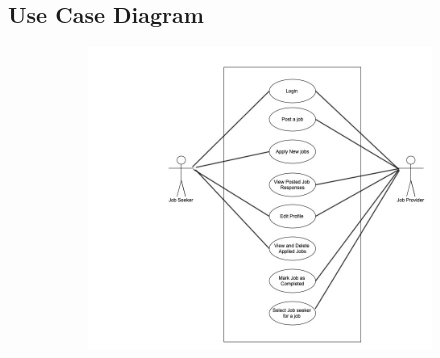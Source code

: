 \documentclass[a4paper 12pt]{article}
\begin{document}
\subsection{Use Case Diagram}

\includegraphics[width=15cm, height=8cm]{usecase.jpg}
\end{document}
